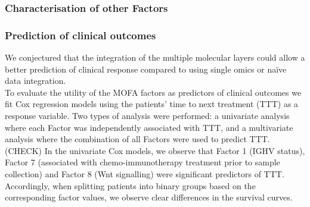 \subsubsection{Characterisation of other Factors}

\subsubsection{Prediction of clinical outcomes}


We conjectured that the integration of the multiple molecular layers could allow a better prediction of clinical response compared to using single omics or naïve data integration.\\
To evaluate the utility of the MOFA factors as predictors of clinical outcomes we fit Cox regression models \cite{Cox1972} using the patients’ time to next treatment (TTT) as a response variable. Two types of analysis were performed: a univariate analysis where each Factor was independently associated with TTT, and a multivariate analysis where the combination of all Factors were used to predict TTT.\\

(CHECK) In the univariate Cox models, we observe  that Factor 1 (IGHV status), Factor 7 (associated with chemo-immunotherapy treatment prior to sample collection) and Factor 8 (Wnt signalling) were significant predictors of TTT. Accordingly, when splitting patients into binary groups based on the corresponding factor values, we observe clear differences in the survival curves.\\

